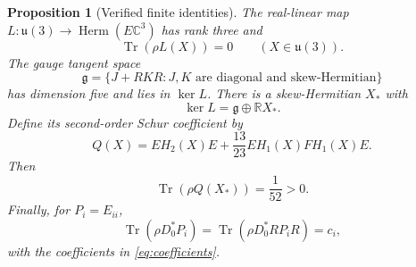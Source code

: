 \documentclass[11pt]{article}
\newtheorem{proposition}[theorem]{Proposition}
\theoremstyle{remark}\newtheorem{remark}[theorem]{Remark}
\newcommand{\C}{\mathbb C}
\newcommand{\R}{\mathbb R}
\newcommand{\Tr}{\operatorname{Tr}}
\newcommand{\Herm}{\operatorname{Herm}}
\newcommand{\gauge}{\mathfrak g}
\begin{document}
\begin{proposition}[Verified finite identities]\label{prop:geometry}
The real-linear map $L:\mathfrak u(3)\to\Herm(E\C^3)$ has rank three and
\begin{equation}\label{eq:stationarity}
 \Tr(\rho L(X))=0\qquad(X\in\mathfrak u(3)).
\end{equation}
The gauge tangent space
\[
 \gauge=\{J+RKR:J,K\text{ are diagonal and skew-Hermitian}\}
\]
has dimension five and lies in $\ker L$. There is a skew-Hermitian $X_*$ with
\begin{equation}\label{eq:kernel}
 \ker L=\gauge\oplus\R X_*.
\end{equation}
Define its second-order Schur coefficient by
\begin{equation}\label{eq:Q}
 Q(X)=EH_2(X)E+\frac{13}{23}EH_1(X)F H_1(X)E.
\end{equation}
Then
\begin{equation}\label{eq:curvature}
 \Tr(\rho Q(X_*))=\frac1{52}>0.
\end{equation}
Finally, for $P_i=E_{ii}$,
\begin{equation}\label{eq:ci-trace}
 \Tr(\rho D_0^*P_i)=\Tr(\rho D_0^*RP_iR)=c_i,
\end{equation}
with the coefficients in \eqref{eq:coefficients}.
\end{proposition}
\end{document}
